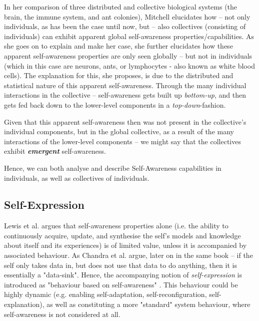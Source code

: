 \documentclass{article}
\begin{document}
In her comparison of three distributed and collective biological systems (the brain, the immune system, and ant colonies), Mitchell \cite{mitchell} elucidates how -- not only individuals, as has been the case until now, but -- also collectives (consisting of individuals) can exhibit apparent global self-awareness properties/capabilities. As she goes on to explain and make her case, she further elucidates how these apparent self-awareness properties are only seen globally -- but not in individuals (which in this case are neurons, ants, or lymphocytes - also known as white blood cells). The explanation for this, she proposes, is due to the distributed and statistical nature of this apparent self-awareness. Through the many individual interactions in the collective -- self-awareness gets built up \textit{bottom-up}, and then gets fed back down to the lower-level components in a \textit{top-down}-fashion.

Given that this apparent self-awareness then was not present in the collective's individual components, but in the global collective, as a result of the many interactions of the lower-level components -- we might say that the collectives exhibit \textbf{\textit{emergent}} self-awareness.

Hence, we can both analyse and describe Self-Awareness capabilities in individuals, as well as collectives of individuals.


\subsection{Self-Expression}
Lewis et al. \cite{sacs16_ch2} argues that self-awareness properties alone (i.e. the ability to continuously acquire, update, and synthesise the self's models and knowledge about itself and its experiences) is of limited value, unless it is accompanied by associated behaviour. As Chandra et al. \cite{sacs16_ch4} argue, later on in the same book -- if the self only takes data in, but does not use that data to do anything, then it is essentially a "data-sink". Hence, the accompanying notion of \textit{self-expression} is introduced as "behaviour based on self-awareness" \cite{sacs16_ch2}. This behaviour could be highly dynamic (e.g. enabling self-adaptation, self-reconfiguration, self-explanation), as well as constituting a more "standard" system behaviour, where self-awareness is not considered at all.

\end{document}
